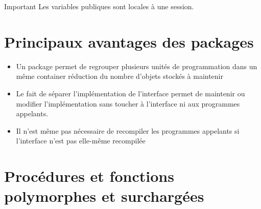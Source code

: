 \documentclass[10pt]{beamer}
\begin{document}
\begin{frame}{\secname}
    \begin{alertblock}{Important}
        Les variables publiques sont locales à une session.
    \end{alertblock}
\end{frame}

\section{Principaux avantages des packages}
\begin{frame}{\secname}
    \begin{itemize}
        \item Un package permet de regrouper plusieurs unités de programmation dans un même container réduction du nombre d'objets stockés à maintenir
        \item Le fait de séparer l'implémentation de l'interface permet de maintenir ou modifier l'implémentation sans toucher à l'interface ni aux programmes appelants.
        \item Il n'est même pas nécessaire de recompiler les programmes appelants si l'interface n'est pas elle-même recompilée
    \end{itemize}
\end{frame}

\section{Procédures et fonctions polymorphes et surchargées}
\begin{frame}{\secname}
    
\end{frame}

\begin{frame}[allowframebreaks]{\secname}
    
\end{frame}
\end{document}
